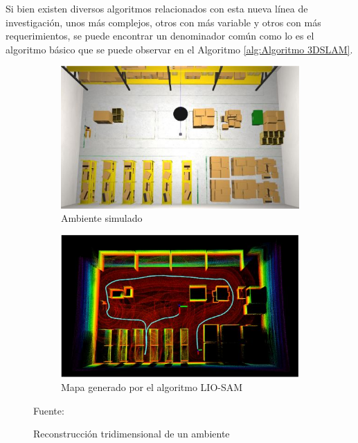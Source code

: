 \begin{itemize}
    Si bien existen diversos algoritmos relacionados con esta nueva línea de investigación, unos más complejos, otros con más variable y otros con más requerimientos, se puede encontrar un denominador común como lo es el algoritmo básico que se puede observar en el Algoritmo \ref{alg:Algoritmo 3DSLAM}.
\end{itemize}

\begin{figure}[H]
    \centering
    \begin{subfigure}[b]{0.45\textwidth}
    \includegraphics[width=\textwidth]{figures/02marco_conceptual/slam3d_1.JPG}
    \caption{Ambiente simulado}
    \label{fig:slam3d_1}
    \end{subfigure}
    \hspace{5mm}
    \begin{subfigure}[b]{0.45\textwidth}
    \includegraphics[width=\textwidth]{figures/02marco_conceptual/slam3d_2.JPG}
    \caption{Mapa generado por el algoritmo LIO-SAM}
    \label{fig:slam3d_2}
    \end{subfigure}
    \caption{ Reconstrucción tridimensional de un ambiente}
    Fuente: \cite{chan_lidar-based_2021}
    \label{fig:3D_SLAM}
\end{figure} 



